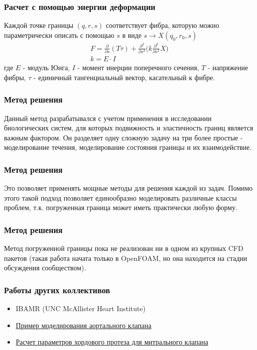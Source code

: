\documentclass[14pt]{beamer}
\begin{document}
\begin{frame}
\frametitle{Расчет с помощью энергии деформации}
Каждой точке границы $(q, r, s)$ соответствует фибра, которую можно параметрически описать с помощью $s$ в виде $s \rightarrow X(q_0, r_0, s)$
\begin{gather}
    \label{eq:strain_energy}
    F =  \frac{\partial}{\partial s}(T \tau) + \frac{\partial^2}{\partial s^2} \Big( k \frac{\partial^2}{\partial s^2} X \Big)\\
    k = E \cdot I
\end{gather}
где $E$ - модуль Юнга, $I$ - момент инерции поперечного сечения, $T$ - напряжение фибры, $\tau$ - единичный тангенциальный вектор, касательный к фибре.
\end{frame}

\begin{frame}
\frametitle{Метод решения}
Данный метод разрабатывался с учетом применения в исследовании биологических систем, для которых подвижность и эластичность границ является важным фактором.
Он разделяет одну сложную задачу на три более простые - моделирование течения, моделирование состояния границы и их взаимодействие.
\end{frame}

\begin{frame}
\frametitle{Метод решения}
Это позволяет применять мощные методы для решения каждой из задач. Помимо этого такой подход позволяет единообразно моделировать различные классы проблем, т.к. погруженная граница может иметь практически любую форму.
\end{frame}

\begin{frame}
\frametitle{Метод решения}
Метод погруженной границы пока не реализован ни в одном из крупных CFD пакетов (такая работа начата только в OpenFOAM, но она находится на стадии обсуждения сообществом).
\end{frame}

\begin{frame}
\frametitle{Работы других коллективов}
\begin{itemize}
    \item IBAMR (UNC McAllister Heart Institute)
    \item \href{run:video/valve\_flow\_side.avi}{Пример моделирования аортального клапана}
    \item \href{run:video/MV\_side.avi}{Расчет параметров хордового протеза для митрального клапана}
\end{itemize}
\end{frame}
\end{document}
